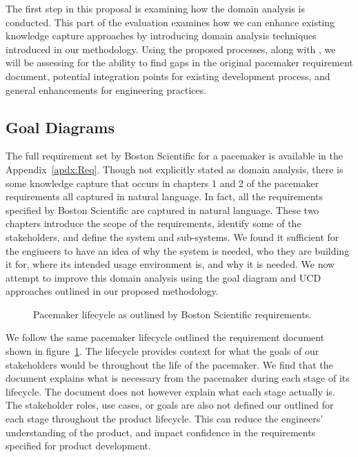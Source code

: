 The first step in this proposal is examining how the domain analysis is conducted. This part of the evaluation examines how we can enhance existing knowledge capture approaches by introducing domain analysis techniques introduced in our methodology. Using the proposed processes, along with \tool, we will be assessing for the ability to find gaps in the original pacemaker requirement document, potential integration points for existing development process, and general enhancements for engineering practices.


\subsection{Goal Diagrams}

The full requirement set by Boston Scientific for a pacemaker is available in the Appendix~\ref{apdx:Req}. Though not explicitly stated as domain analysis, there is some knowledge capture that occurs in chapters 1 and 2 of the pacemaker requirements all captured in natural language. In fact, all the requirements specified by Boston Scientific are captured in natural language. These two chapters introduce the scope of the requirements, identify some of the stakeholders, and define the system and sub-systems. We found it sufficient for the engineers to have an idea of why the system is needed, who they are building it for, where its intended usage environment is, and why it is needed. We now attempt to improve this domain analysis using the goal diagram and  \ac{UCD} approaches outlined in our proposed methodology.


\begin{figure}
	\centering
	
	\caption{Pacemaker lifecycle as outlined by Boston Scientific requirements.}
	\label{fig:Pacemaker_lifecycle}
\end{figure}

We follow the same pacemaker lifecycle outlined the requirement document shown in figure~\ref{fig:Pacemaker_lifecycle}. The lifecycle provides context for what the goals of our stakeholders would be throughout the life of the pacemaker. We find that the document explains what is necessary from the pacemaker during each stage of its lifecycle. The document does not however explain what each stage actually is. The stakeholder roles, use cases, or goals are also not defined our outlined for each stage throughout the product lifecycle. This can reduce the engineers' understanding of the product, and impact confidence in the requirements specified for product development.

